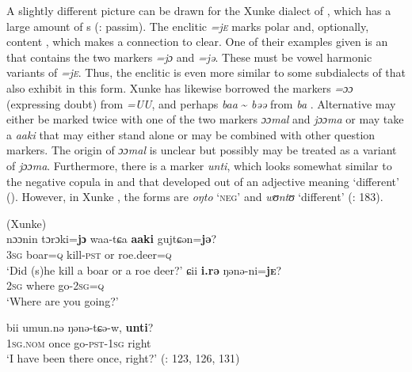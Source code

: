 \largerpage[2]
A slightly different picture can be drawn for the Xunke dialect of , which has a large amount of s (\citealt{ZhangLiZhang1989}: passim). The enclitic \textit{=j\textsc{e}} marks polar and, optionally, content , which makes a connection to  clear. One of their examples given is an  that contains the two markers \textit{=jɔ} and \textit{=jə}. These must be vowel harmonic variants of \textit{=j\textsc{e}}. Thus, the enclitic is even more similar to some subdialects of  that also exhibit  in this form. Xunke  has likewise borrowed the markers \textit{=ɔɔ} (expressing doubt) from  \textit{=UU}, and perhaps \textit{baa} {\textasciitilde} \textit{bəə} from  \textit{ba} . Alternative  may either be marked twice with one of the two markers \textit{ɔɔmal} and \textit{jɔɔma} or may take a  \textit{aaki} that may either stand alone or may be combined with other question markers. The origin of \textit{ɔɔmal} is unclear but possibly may be treated as a variant of \textit{jɔɔma}. Furthermore, there is a  marker \textit{unti}, which looks somewhat similar to the negative copula in  and  that developed out of an adjective meaning ‘different’ (\citealt{Hölzl2015a}). However, in Xunke , the forms are \textit{oŋto} ‘\textsc{neg}’ and \textit{wʊntʊ} ‘different’ (\citealt{ZhangLiZhang1989}: 183).

\ea%
    \label{ex:tungu:24}
     (Xunke)\\
    \ea
    \gll nɔɔnin  tɔrɔki=\textbf{{jɔ}} waa-tɕa \textbf{{aaki}} gujtɕən=\textbf{{jə}}?\\
    3\textsc{sg}  boar=\textsc{q}    kill-\textsc{pst}  or  roe.deer=\textsc{q}\\
    \glt ‘Did (s)he kill a boar or a roe deer?’
\newpage    
    \ex
    \gll ɕii \textbf{{i.rə}} ŋənə-ni=\textbf{{j}}\textbf{\textsc{e}}?\\
    2\textsc{sg}  where  go-2\textsc{sg}=\textsc{q}\\
    \glt ‘Where are you going?’
    
    \ex
    \gll bii    umun.nə  ŋənə-tɕə-w, \textbf{{unti}}?\\
    1\textsc{sg}.\textsc{nom}  once    go-\textsc{pst}-1\textsc{sg}  right\\
    \glt ‘I have been there once, right?’ (\citealt{ZhangLiZhang1989}: 123, 126, 131)\z\z

